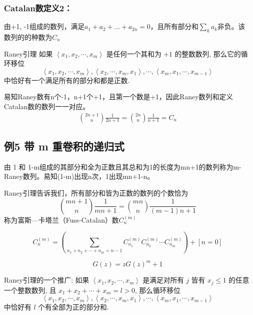\subsubsection*{Catalan数定义2：}
由+1, -1组成的数列，满足$a_1 + a_2 + \dots + a_{2n} = 0$，且所有部分和$\sum_k a_k$非负。该数列的的种数为$C_n$

Raney引理
如果 $\left\langle x_{1}, x_{2}, \cdots, x_{m}\right\rangle$ 是任何一个其和为 $+1$ 的整数数列, 那么它的循环移位
$$
\left\langle x_{1}, x_{2}, \cdots, x_{m}\right\rangle,\left\langle x_{2}, \cdots, x_{m}, x_{1}\right\rangle, \cdots,\left\langle x_{m}, x_{1}, \cdots, x_{m-1}\right\rangle
$$
中恰好有一个满足所有的部分和都是正数.

易知Raney数有n个-1，n+1个+1，且第一个数是+1，因此Raney数列和定义Catalan数的数列一一对应。
\begin{align*}
    {2 n+1  \choose n} \frac{1}{2 n+1}={2 n  \choose n} \frac{1}{n+1}=C_{n}
\end{align*}

\subsection{例5 带 m 重卷积的递归式}
由 1 和 1-m组成的其部分和全为正数且其总和为1的长度为mn+1的数列称为m-Raney数列。易知(1-m)出现n次，1出现mn+1-n。

Raney引理告诉我们，所有部分和皆为正数的数列的个数恰为
\begin{equation}
    {m n+1  \choose n} \frac{1}{m n+1}={m n  \choose n} \frac{1}{(m-1) n+1}
\end{equation}
称为富斯—卡塔兰（Fuss-Catalan）数$C_n^{(m)}$

\begin{equation}
    C_{n}^{(m)}=\left(\sum_{n_{1}+n_{2}+\cdots+n_{m}=n-1} C_{n_{1}}^{(m)} C_{n_{2}}^{(m)} \cdots C_{n_{m}}^{(m)}\right)+[n=0]
\end{equation}

\begin{equation}
    G(z)=z G(z)^{m}+1
\end{equation}

Raney引理的一个推广: 如果 $\left\langle x_{1}, x_{2}, \cdots, x_{m}\right\rangle$ 是满足对所有 $j$ 皆有 $x_{j} \leqslant 1$ 的任意一个整数数列, 且 $x_{1}+x_{2}+\cdots+x_{m}=l>0$, 那么循环移位
$$
\left\langle x_{1}, x_{2}, \cdots, x_{m}\right\rangle,\left\langle x_{2}, \cdots, x_{m}, x_{1}\right\rangle, \cdots,\left\langle x_{m}, x_{1}, \cdots, x_{m-1}\right\rangle
$$
中恰好有 $l$ 个有全部为正的部分和.


